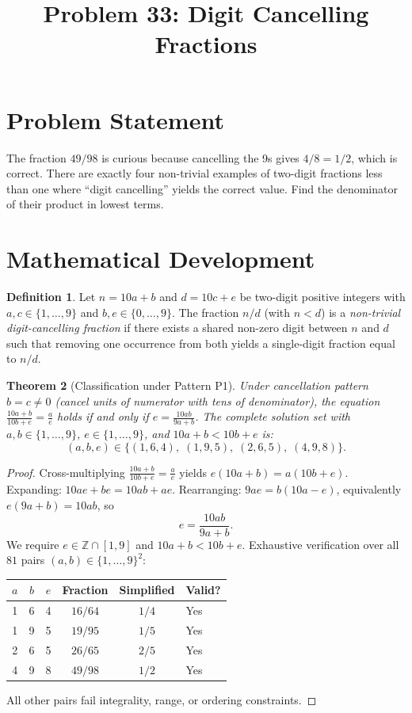 \documentclass[12pt]{article}
\title{Problem 33: Digit Cancelling Fractions}
\author{}
\date{}
\newtheorem{theorem}{Theorem}
\theoremstyle{definition}
\newtheorem{definition}[theorem]{Definition}
\begin{document}
\maketitle

\section{Problem Statement}
The fraction $49/98$ is curious because cancelling the 9s gives $4/8 = 1/2$, which is correct. There are exactly four non-trivial examples of two-digit fractions less than one where ``digit cancelling'' yields the correct value. Find the denominator of their product in lowest terms.

\section{Mathematical Development}

\begin{definition}
Let $n = 10a + b$ and $d = 10c + e$ be two-digit positive integers with $a,c \in \{1,\ldots,9\}$ and $b,e \in \{0,\ldots,9\}$. The fraction $n/d$ (with $n < d$) is a \emph{non-trivial digit-cancelling fraction} if there exists a shared non-zero digit between $n$ and $d$ such that removing one occurrence from both yields a single-digit fraction equal to $n/d$.
\end{definition}

\begin{theorem}[Classification under Pattern P1]
\label{thm:p1}
Under cancellation pattern $b = c \ne 0$ (cancel units of numerator with tens of denominator), the equation $\frac{10a+b}{10b+e} = \frac{a}{e}$ holds if and only if $e = \frac{10ab}{9a+b}$. The complete solution set with $a,b \in \{1,\ldots,9\}$, $e \in \{1,\ldots,9\}$, and $10a+b < 10b+e$ is:
\[
(a,b,e) \in \{(1,6,4),\; (1,9,5),\; (2,6,5),\; (4,9,8)\}.
\]
\end{theorem}

\begin{proof}
Cross-multiplying $\frac{10a+b}{10b+e} = \frac{a}{e}$ yields $e(10a+b) = a(10b+e)$. Expanding: $10ae + be = 10ab + ae$. Rearranging: $9ae = b(10a - e)$, equivalently $e(9a + b) = 10ab$, so
\[
e = \frac{10ab}{9a + b}.
\]
We require $e \in \mathbb{Z} \cap [1,9]$ and $10a + b < 10b + e$. Exhaustive verification over all $81$ pairs $(a,b) \in \{1,\ldots,9\}^2$:
\begin{center}
\begin{tabular}{cccccl}
\toprule
$a$ & $b$ & $e$ & Fraction & Simplified & Valid? \\
\midrule
1 & 6 & 4 & $16/64$ & $1/4$ & Yes \\
1 & 9 & 5 & $19/95$ & $1/5$ & Yes \\
2 & 6 & 5 & $26/65$ & $2/5$ & Yes \\
4 & 9 & 8 & $49/98$ & $1/2$ & Yes \\
\bottomrule
\end{tabular}
\end{center}
All other pairs fail integrality, range, or ordering constraints.
\end{proof}
\end{document}
